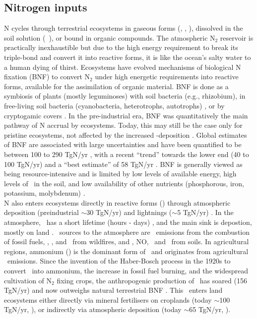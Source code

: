 \subsection{Nitrogen inputs}
N cycles through terrestrial ecosystems in gaseous forms (\nn , \nox , \nhhh ), dissolved in the soil solution (\nooo\, \nhhhh ), or bound in organic compounds. The atmospheric N$_2$ reservoir is practically inexhaustible but due to the high energy requirement to break its triple-bond and convert it into reactive forms, it is like the ocean's salty water to a human dying of thirst. Ecosystems have evolved mechanisms of biological N fixation (BNF) to convert N$_2$ under high energetic requirements into reactive forms, available for the assimilation of organic material. BNF is done as a symbiosis of plants (mostly leguminoses) with soil bacteria (e.g., rhizobium), in free-living soil bacteria (cyanobacteria, heterotrophs, autotrophs) \citep{vitousek02}, or by cryptogamic covers \citep{elbert12}. In the pre-industrial era, BNF was quantitatively the main pathway of N accrual by ecosystems. Today, this may still be the case only for pristine ecosystems, not affected by the increased \nr -deposition \citep{cleveland99}. Global estimates of BNF are associated with large uncertainties and have been quantified to be between 100 to 290 TgN/yr \citep{cleveland99}, with a recent ``trend'' towards the lower end (40 to 100 TgN/yr) and a ``best estimate'' of 58 TgN/yr \citep{vitousek13}. BNF is generally viewed as being resource-intensive and is limited by low levels of available energy, high levels of \nr\ in the soil, and low availability of other nutrients (phosphorous, iron, potassium, molybdenum) \citep{vitousek13}.\\

N also enters ecosystems directly in reactive forms (\nr ) through atmospheric deposition (preindustrial $\sim$30 TgN/yr) and lightnings ($\sim$5 TgN/yr) \citep{galloway04}. In the atmosphere, \nr\ has a short  lifetime (hours - days) \citep{galloway03}, and the main sink is depostion, mostly on land \citep{dentener06}. \nr\ sources to the atmosphere are \nox\ emissions from the combustion of fossil fuels, \nox , \nno , and \nhhh\ from wildfires, and \nox , NO, \nhhh\, and \nno\ from  soils. In agricultural regions, ammonium (\nhhhh ) is the dominant form of \nr\ and originates from agricultural \nhhh\ emissions. Since the invention of the Haber-Bosch process in the 1920s to convert \nn\ into ammonium, the increase in fossil fuel burning, and the widespread cultivation of N$_2$ fixing crops, the anthropogenic production of \nr\ has soared (156 TgN/yr) and now outweighs natural terrestrial BNF \citep{galloway04}. This \nr\ enters land ecosystems either directly via mineral fertilisers on croplands (today $\sim$100 TgN/yr, \citet{galloway04, zaehle11ngeo}), or indirectly via atmospheric deposition (today $\sim$65 TgN/yr, \citet{galloway04, lamarque11cc}). 

